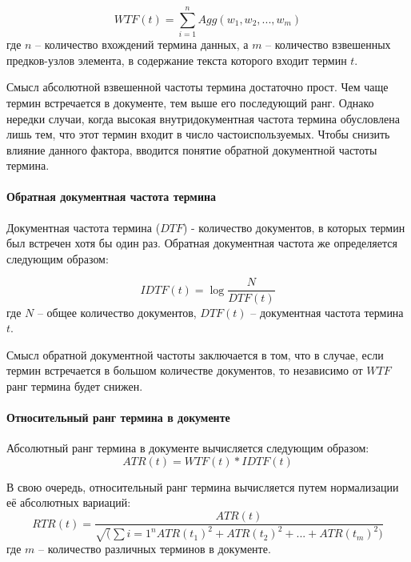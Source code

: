\begin{equation}
WTF(t) = \sum_{i = 1}^{n}Agg(w_1, w_2, ..., w_m)
\end{equation} где $n$ -- количество вхождений термина данных, а $m$ -- количество взвешенных предков-узлов элемента, в содержание текста которого входит термин $t$.

Смысл абсолютной взвешенной частоты термина достаточно прост. Чем чаще термин встречается в документе, тем выше его последующий ранг. Однако нередки случаи, когда высокая внутридокументная частота термина обусловлена лишь тем, что этот термин входит в число частоиспользуемых. Чтобы снизить влияние данного фактора, вводится понятие обратной документной частоты термина.

\paragraph{Обратная документная частота термина}

Документная частота термина ($DTF$) - количество документов, в которых термин был встречен хотя бы один раз. Обратная документная частота же определяется следующим образом:

\begin{equation}
IDTF(t) = \log\frac{N}{DTF(t)}
\end{equation} где $N$ -- общее количество документов, $DTF(t)$ -- документная частота термина $t$.

Смысл обратной документной частоты заключается в том, что в случае, если термин встречается в большом количестве документов, то независимо от $WTF$ ранг термина будет снижен.

\paragraph{Относительный ранг термина в документе}

Абсолютный ранг термина в документе вычисляется следующим образом:
\begin{equation}
ATR(t) = WTF(t) * IDTF(t)
\end{equation}

В свою очередь, относительный ранг термина вычисляется путем нормализации её абсолютных вариаций:
\begin{equation}
RTR(t) = \frac{ATR(t)}{\sqrt(\sum{i = 1}^{n}ATR(t_1)^2 + ATR(t_2)^2 + ... + ATR(t_m)^2)}
\end{equation} где $m$ -- количество различных терминов в документе.

